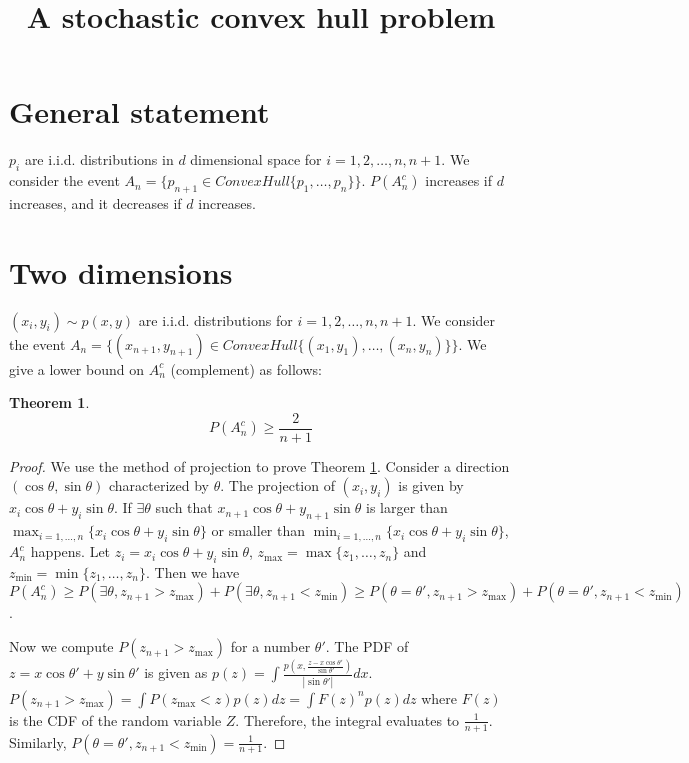 \documentclass{article}
\title{A stochastic convex hull problem}
\newtheorem{theorem}{Theorem}
\begin{document}
\maketitle
\section{General statement}
$p_i$ are i.i.d. distributions in $d$ dimensional space
for $i=1,2,\dots, n, n+1$. We consider the event
$A_n =\{p_{n+1} \in ConvexHull\{p_1,
\dots, p_n\} \}$.
$P(A_n^c)$ increases if $d$ increases,
and it   decreases if $d$ increases.
\section{Two dimensions}
$(x_i, y_i) \sim p(x,y)$ are i.i.d. distributions
for $i=1,2,\dots, n, n+1$. We consider the event
$A_n =\{(x_{n+1}, y_{n+1}) \in ConvexHull\{(x_1, y_1),
\dots, (x_n, y_n)\} \}$. We give a lower bound on $A_n^c$
(complement) as follows:
\begin{theorem}\label{thm:lower_bound}
    \begin{equation}
        P(A_n^c) \geq \frac{2}{n+1}
    \end{equation}
\end{theorem}
\begin{proof}
We use the method of projection to prove Theorem
\ref{thm:lower_bound}.
Consider a direction $(\cos\theta, \sin \theta)$
characterized by $\theta$. The projection of $(x_i, y_i)$
is given by $x_i \cos\theta + y_i \sin \theta$.
If $\exists \theta$ such that
$x_{n+1}\cos\theta + y_{n+1} \sin \theta$
is larger than $\max_{i=1,\dots, n} \{x_{i}\cos\theta +
y_{i} \sin \theta\}$ or smaller than
$\min_{i=1,\dots, n} \{x_{i}\cos\theta +
y_{i} \sin \theta\}$, $A_n^c$ happens.
Let $z_i = x_i \cos \theta + y_i \sin \theta$,
$z_{\max}=\max\{z_1, \dots, z_n\}$ and
$z_{\min}=\min\{z_1, \dots, z_n\}$.
Then we have $P(A_n^c) \geq P(\exists \theta, z_{n+1} > z_{\max})
+ P(\exists \theta, z_{n+1} < z_{\min})
\geq P(\theta=\theta', z_{n+1} > z_{\max})
+ P(\theta=\theta', z_{n+1} < z_{\min}) $.

Now we compute $P(z_{n+1} > z_{\max})$
for a number $\theta'$.
The PDF of $z=x\cos \theta' + y \sin \theta'$
is given as $p(z)=\int
\frac{p(x, \frac{z-x \cos \theta'}
{\sin \theta'})}{|\sin \theta'|}dx$.
$P(z_{n+1} > z_{\max}) = \int P(z_{\max} < z)p(z)dz
= \int F(z)^n p(z)dz$ where $F(z)$ is the CDF of the
random variable $Z$. Therefore, the integral evaluates
to $\frac{1}{n+1}$. Similarly,
$P(\theta=\theta', z_{n+1} < z_{\min})=
\frac{1}{n+1}$.
\end{proof}
\end{document}
